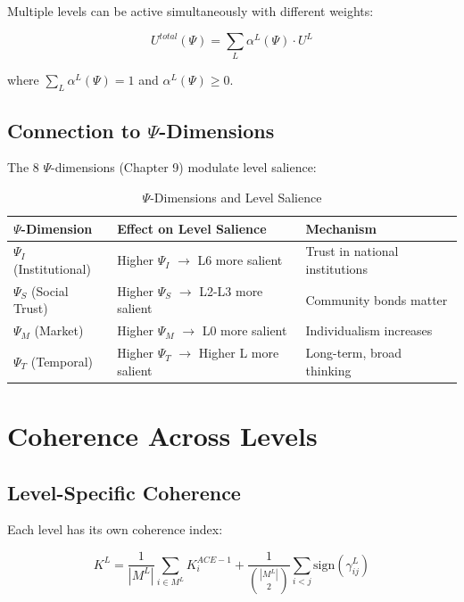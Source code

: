 Multiple levels can be active simultaneously with different weights:

\begin{equation}
U^{total}(\Psi) = \sum_L \alpha^L(\Psi) \cdot U^L
\end{equation}

where $\sum_L \alpha^L(\Psi) = 1$ and $\alpha^L(\Psi) \geq 0$.

\subsection{Connection to $\Psi$-Dimensions}

The 8 $\Psi$-dimensions (Chapter 9) modulate level salience:

\begin{table}[htbp]
\centering
\caption{$\Psi$-Dimensions and Level Salience}
\label{tab:aaa-psi-levels}
\renewcommand{\arraystretch}{1.3}
\begin{tabular}{@{}lll@{}}
\toprule
\textbf{$\Psi$-Dimension} & \textbf{Effect on Level Salience} & \textbf{Mechanism} \\
\midrule
$\Psi_I$ (Institutional) & Higher $\Psi_I$ $\to$ L6 more salient & Trust in national institutions \\
$\Psi_S$ (Social Trust) & Higher $\Psi_S$ $\to$ L2-L3 more salient & Community bonds matter \\
$\Psi_M$ (Market) & Higher $\Psi_M$ $\to$ L0 more salient & Individualism increases \\
$\Psi_T$ (Temporal) & Higher $\Psi_T$ $\to$ Higher L more salient & Long-term, broad thinking \\
\bottomrule
\end{tabular}
\end{table}

\section{Coherence Across Levels}
\label{sec:aaa-coherence}

\subsection{Level-Specific Coherence}

Each level has its own coherence index:

\begin{equation}
K^L = \frac{1}{|M^L|} \sum_{i \in M^L} K^{ACE-1}_i + \frac{1}{\binom{|M^L|}{2}} \sum_{i < j} \text{sign}(\gamma^L_{ij})
\end{equation}

